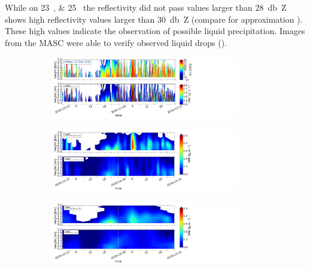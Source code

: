 While on \SIlist{23;25}{\dec} the reflectivity did not pass values larger than \SI{28}{\decibel Z} shows  high reflectivity values larger than \SI{30}{\decibel Z} (compare for approximation ). These high values indicate the observation of possible liquid precipitation. Images from the MASC were able to verify observed liquid drops (). 
\begin{figure}[t]
	\centering
	\begin{subfigure}[t]{\textwidth}
		\centering
		\includegraphics[trim={0.cm 2.2cm 19.cm 0.5cm},clip,width=0.9\textwidth]{./fig_obs_ret/20161223}
		\caption{}\label{fig:SWC:ret_23}
	\end{subfigure}
	\begin{subfigure}[t]{\textwidth}
		\centering
		\includegraphics[trim={0.cm 2.2cm 19.cm 0.5cm},clip,width=0.9\textwidth]{./fig_vert_SWC_EM/20161223}
		\caption{}\label{fig:SWC_EM:23}
	\end{subfigure}
	\begin{subfigure}[t]{\textwidth}
		\centering
		\includegraphics[trim={0.cm 0.8cm 19.cm 0.5cm},clip,width=0.9\textwidth]{./fig_vert_SWC_3h/20161223}

\end{subfigure}
\end{figure}

